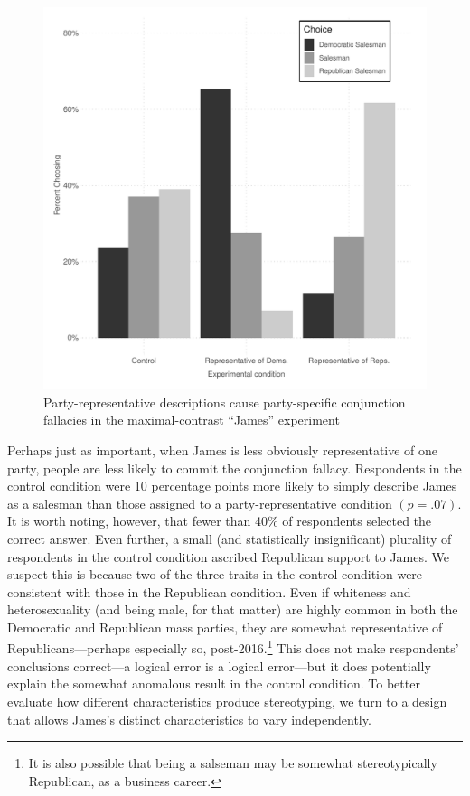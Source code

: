 \documentclass[12pt, letterpaper]{article}
\begin{document}
\begin{figure}
\caption{Party-representative descriptions cause party-specific conjunction fallacies in the maximal-contrast ``James'' experiment}
\label{fig:James}
\begin{center}
\includegraphics[width=1\textwidth]{../figs/fig_2_james_max_contrast.pdf}
\end{center}
\end{figure}

Perhaps just as important, when James is less obviously representative of one party, people are less likely to commit the conjunction fallacy. Respondents in the control condition were 10 percentage points more likely to simply describe James as a salesman than those assigned to a party-representative condition $(p=.07)$. It is worth noting, however, that fewer than 40\% of respondents selected the correct answer. Even further, a small (and statistically insignificant) plurality of respondents in the control condition ascribed Republican support to James. We suspect this is because two of the three traits in the control condition were consistent with those in the Republican condition. Even if whiteness and heterosexuality (and being male, for that matter) are highly common in both the Democratic and Republican mass parties, they are somewhat representative of Republicans---perhaps especially so, post-2016.\footnote{It is also possible that being a salseman may be somewhat stereotypically Republican, as a business career.} This does not make respondents' conclusions correct---a logical error is a logical error---but it does potentially explain the somewhat anomalous result in the control condition. To better evaluate how different characteristics produce stereotyping, we turn to a design that allows James's distinct characteristics to vary independently.
\end{document}
